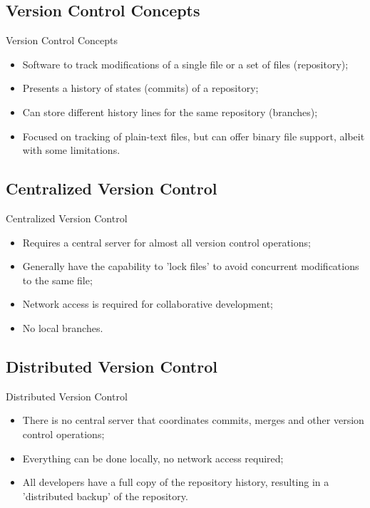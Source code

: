 \documentclass{beamer}
\begin{document}
\subsection{Version Control Concepts}
\begin{frame}{Version Control Concepts}
  \begin{itemize}
    \item Software to track modifications of a single file or a set of files (repository);
    \item Presents a history of states (commits) of a repository;
    \item Can store different history lines for the same repository (branches);
    \item Focused on tracking of plain-text files, but can offer binary file support, albeit with some limitations.
  \end{itemize}
\end{frame}

\subsection{Centralized Version Control}
\begin{frame}{Centralized Version Control}
  \begin{itemize}
    \item Requires a central server for almost all version control operations;
    \item Generally have the capability to 'lock files' to avoid concurrent modifications to the same file;
    \item Network access is required for collaborative development;
    \item No local branches.
  \end{itemize}
\end{frame}

\subsection{Distributed Version Control}
\begin{frame}{Distributed Version Control}
  \begin{itemize}
    \item There is no central server that coordinates commits, merges and other version control operations;
    \item Everything can be done locally, no network access required;
    \item All developers have a full copy of the repository history, resulting in a 'distributed backup' of the repository.
  \end{itemize}
\end{frame}
\end{document}
